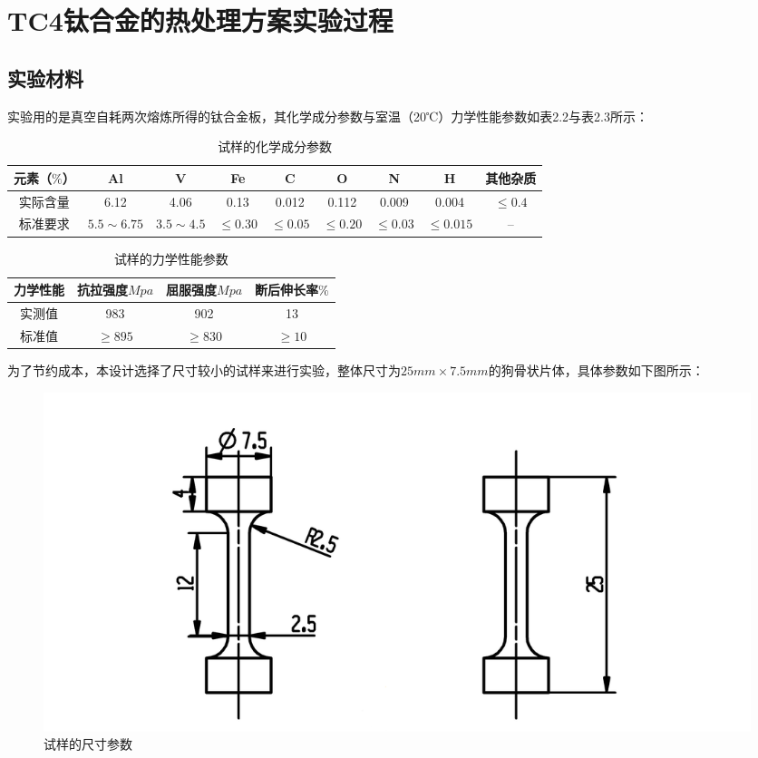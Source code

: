 \section{TC4钛合金的热处理方案实验过程}
\subsection{实验材料}
实验用的是真空自耗两次熔炼所得的钛合金板，其化学成分参数与室温（20℃）力学性能参数如表2.2与表2.3所示：
\begin{table}[htbp]
	\centering
	\label{sec:mytc4chem}
	\caption{试样的化学成分参数}
	\begin{tabular}{ccccccccc}
		\toprule
	元素（$ \% $） & Al & V &Fe &C& O& N &H &其他杂质\\ \midrule
	实际含量 & 6.12&4.06 &0.13 &0.012&0.112&0.009&0.004 &$ \le 0.4 $ \\
	标准要求 &$ 5.5\sim 6.75 $ & $ 3.5\sim 4.5 $&$ \le 0.30 $ & $ \le 0.05 $&$ \le 0.20 $&$ \le 0.03$ &$ \le 0.015 $  & -- \\ \bottomrule
	\end{tabular}
\end{table}

\begin{table}[htbp]
	\centering
	\label{sec:mytc4machin}
	\caption{试样的力学性能参数}
	\begin{tabular}{cccc}
		\toprule
		力学性能& 抗拉强度$Mpa  $& 屈服强度$ Mpa $&断后伸长率$ \% $\\ \midrule
		实测值 & 983 &902 & 13\\
		标准值 &$ \ge 895 $&$ \ge 830 $&$ \ge 10 $ \\ \bottomrule
	\end{tabular}
\end{table}


为了节约成本，本设计选择了尺寸较小的试样来进行实验，整体尺寸为$ 25mm\times 7.5mm $的狗骨状片体，具体参数如下图所示：

\begin{figure}[h!]
	\centering
	\includegraphics[width=0.99\linewidth]{pic/试样}
	\caption{试样的尺寸参数}
	\label{fig:试样尺寸}
\end{figure}

